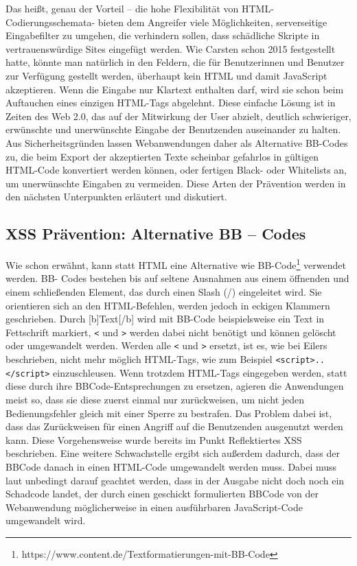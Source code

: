 Das heißt, genau der Vorteil – die hohe Flexibilität von HTML-Codierungsschemata- bieten dem Angreifer viele Möglichkeiten, serverseitige Eingabefilter zu umgehen, die verhindern sollen, dass schädliche Skripte in vertrauenswürdige Sites eingefügt werden.
Wie Carsten \textcite{eilers2015} schon 2015 festgestellt hatte, könnte man natürlich in den Feldern, die für Benutzerinnen und Benutzer zur Verfügung gestellt werden, überhaupt kein HTML und damit JavaScript akzeptieren. Wenn die Eingabe nur Klartext enthalten darf, wird sie schon beim Auftauchen eines einzigen HTML-Tags abgelehnt. Diese einfache Lösung ist in Zeiten des Web 2.0, das auf der Mitwirkung der User abzielt, deutlich schwieriger, erwünschte und unerwünschte Eingabe der Benutzenden auseinander zu halten. Aus Sicherheitsgründen lassen Webanwendungen daher als Alternative BB-Codes zu, die beim Export der akzeptierten Texte scheinbar gefahrlos in gültigen HTML-Code konvertiert werden können, oder fertigen Black- oder Whitelists an, um unerwünschte Eingaben zu vermeiden. Diese Arten der Prävention werden in den nächsten Unterpunkten erläutert und diskutiert.

\subsection{XSS Prävention: Alternative BB – Codes}
\label{subsection:prevention_bb-codes}

Wie schon erwähnt, kann statt HTML eine Alternative wie BB-Code\footnote{https://www.content.de/Textformatierungen-mit-BB-Code} verwendet werden. BB- Codes bestehen bis auf seltene Ausnahmen aus einem öffnenden und einem schließenden Element, das durch einen Slash (/) eingeleitet wird. Sie orientieren sich an den HTML-Befehlen, werden jedoch in eckigen Klammern geschrieben. Durch [b]Text[/b] wird mit BB-Code beispielsweise ein Text in Fettschrift markiert, \verb+<+ und \verb+>+ werden dabei nicht benötigt und können gelöscht oder umgewandelt werden.
Werden alle \verb+<+ und \verb+>+ ersetzt, ist es, wie bei Eilers beschrieben, nicht mehr möglich HTML-Tags, wie zum Beispiel \verb+<script>..</script>+  einzuschleusen. Wenn trotzdem HTML-Tags eingegeben werden, statt diese durch ihre BBCode-Entsprechungen zu ersetzen, agieren die Anwendungen meist so, dass sie diese zuerst einmal nur zurückweisen, um nicht jeden Bedienungsfehler gleich mit einer Sperre zu bestrafen. Das Problem dabei ist, dass das Zurückweisen für einen Angriff auf die Benutzenden ausgenutzt werden kann. Diese Vorgehensweise wurde bereits im Punkt Reflektiertes XSS beschrieben. Eine weitere Schwachstelle ergibt sich außerdem dadurch, dass der BBCode danach in einen HTML-Code umgewandelt werden muss. Dabei muss laut \textcite{eilers2015} unbedingt darauf geachtet werden, dass in der Ausgabe nicht doch noch ein Schadcode landet, der durch einen geschickt formulierten BBCode von der Webanwendung möglicherweise in einen ausführbaren JavaScript-Code umgewandelt wird.

